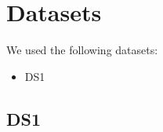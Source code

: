 \section{Datasets}
We used the following datasets:
\begin{itemize}
\item DS1
\end{itemize}

\subsection{DS1}
